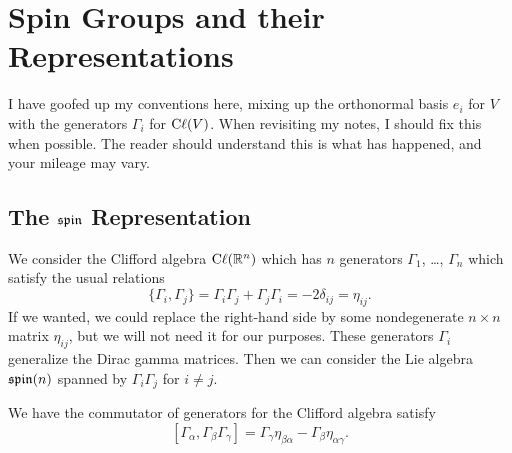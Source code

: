 \chapter{Spin Groups and their Representations}

\begin{ddanger}
I have goofed up my conventions here, mixing up the orthonormal basis
$e_{i}$ for $V$ with the generators $\Gamma_{i}$ for $\mathrm{C}\ell(V)$. When
revisiting my notes, I should fix this when possible. The reader should
understand this is what has happened, and your mileage may vary.
\end{ddanger}

\section{The $\operatorname{\mathfrak{spin}}$ Representation}

\M
We consider the Clifford algebra $\mathrm{C}\ell(\mathbb{R}^{n})$ which has $n$ generators
$\Gamma_{1}$, \dots, $\Gamma_{n}$ which satisfy the usual relations
\begin{equation}\label{eq:spin:clifford-anticommutator}
\{\Gamma_{i}, \Gamma_{j}\} = \Gamma_{i}\Gamma_{j} + \Gamma_{j}\Gamma_{i} = -2\delta_{ij} = \eta_{ij}.
\end{equation}
If we wanted, we could replace the right-hand side by some nondegenerate
$n\times n$ matrix $\eta_{ij}$, but we will not need it for our purposes.
These generators $\Gamma_{i}$ generalize the Dirac gamma matrices. Then we
can consider the Lie algebra $\operatorname{\mathfrak{spin}}(n)$ spanned by $\Gamma_{i}\Gamma_{j}$ for
$i\neq j$.

\begin{lemma}\label{lemma:spin:clifford-algebra:commutator-of-one-and-two}
We have the commutator of generators for the Clifford algebra satisfy
$$[\Gamma_{\alpha}, \Gamma_{\beta}\Gamma_{\gamma}]=\Gamma_{\gamma}\eta_{\beta\alpha}-\Gamma_{\beta}\eta_{\alpha\gamma}.$$
\end{lemma}

